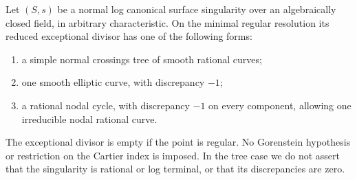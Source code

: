 
\begin{lemma}
\label{D:lc-exceptional-configurations}
Let $(S,s)$ be a normal log canonical surface singularity over
an algebraically closed field, in arbitrary characteristic.
On the minimal regular resolution its reduced exceptional
divisor has one of the following forms:
\begin{enumerate}
\item a simple normal crossings tree of smooth rational curves;
\item one smooth elliptic curve, with discrepancy $-1$;
\item a rational nodal cycle, with discrepancy $-1$ on every
component, allowing one irreducible nodal rational curve.
\end{enumerate}
The exceptional divisor is empty if the point is regular.
No Gorenstein hypothesis or restriction on the Cartier
index is imposed.  In the tree case we do not assert that
the singularity is rational or log terminal, or that its
discrepancies are zero.
\end{lemma}
